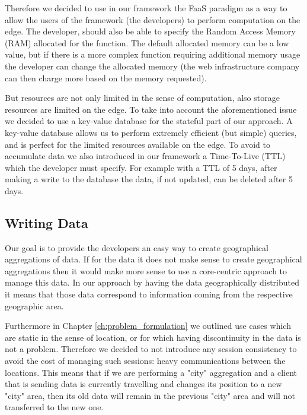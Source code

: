 Therefore we decided to use in our framework the FaaS paradigm as a way to allow the users of the framework (the developers) to perform computation on the edge. The developer, should also be able to specify the Random Access Memory (RAM) allocated for the function. The default allocated memory can be a low value, but if there is a more complex function requiring additional memory usage the developer can change the allocated memory (the web infrastructure company can then charge more based on the memory requested).

But resources are not only limited in the sense of computation, also storage resources are limited on the edge. To take into account the aforementioned issue we decided to use a key-value database for the stateful part of our approach. A key-value database allows us to perform extremely efficient (but simple) queries, and is perfect for the limited resources available on the edge. To avoid to accumulate data we also introduced in our framework a Time-To-Live (TTL) which the developer must specify. For example with a TTL of 5 days, after making a write to the database the data, if not updated, can be deleted after 5 days.


\subsection{Writing Data}
Our goal is to provide the developers an easy way to create geographical aggregations of data. If for the data it does not make sense to create geographical aggregations then it would make more sense to use a core-centric approach to manage this data. In our approach by having the data geographically distributed it means that those data correspond to information coming from the respective geographic area.

Furthermore in Chapter \ref{ch:problem_formulation} we outlined use cases which are static in the sense of location, or for which having discontinuity in the data is not a problem. Therefore we decided to not introduce any session consistency to avoid the cost of managing such sessions: heavy communications between the locations. This means that if we are performing a "city" aggregation and a client that is sending data is currently travelling and changes its position to a new "city" area, then its old data will remain in the previous "city" area and will not transferred to the new one.

